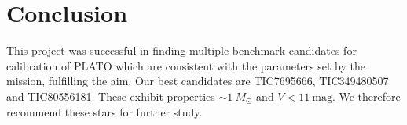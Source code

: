 \section{Conclusion}\label{sec:Conclusion}

This project was successful in finding multiple benchmark candidates for calibration of PLATO which are consistent with the parameters set by the mission, fulfilling the aim. Our best candidates are TIC7695666, TIC349480507 and TIC80556181. These exhibit properties $\sim 1 \ M_{\odot}$ and $V<11\mathrm{\ mag}$. We therefore recommend these stars for further study. 